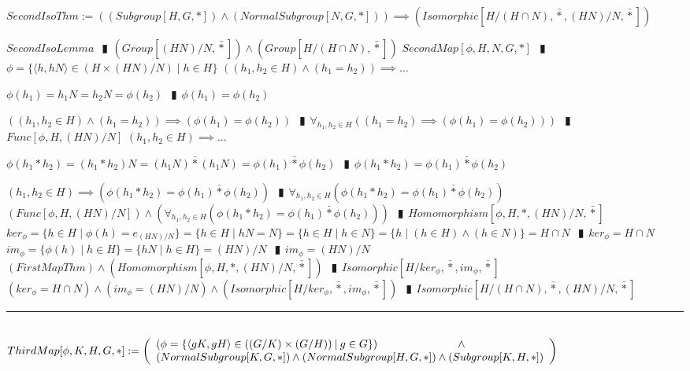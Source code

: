 \documentclass{book}
\newcommand{\abr}{:=}
\newcommand{\pipe}{$\phantom{(}\vrectangleblack\phantom{)}$}
\newcommand{\pr}[1]{\left(#1\right)}
\newcommand{\bbin}[1]{\mathbin{{\bar{#1}}}}
\newcommand{\st}{\mathbin{|}}
\begin{document}
$SecondIsoThm \abr \pr{(Subgroup[H, G, *]) \land (NormalSubgroup[N, G, *])} \implies \pr{Isomorphic[H / (H \cap N), \bbin{*}, (H N) / N, \bbin{*}]}$
\begin{enumerate}
  \lit $SecondIsoLemma$ \pipe $\pr{Group[(H N) / N, \bbin{*}]} \land \pr{Group[H / (H \cap N), \bbin{*}]}$
  \lit $SecondMap[\phi, H, N, G, *]$ \pipe $\phi = \{\langle h, h N \rangle \in \pr{H \times (H N) / N} \st h \in H\}$
  \lit $\pr{(h_1, h_2 \in H) \land (h_1 = h_2)} \implies \ldots$
  \begin{enumerate}
    \lit $\phi(h_1) = h_1 N = h_2 N = \phi(h_2)$ \pipe $\phi(h_1) = \phi(h_2)$
  \end{enumerate}
  \lit $\pr{(h_1, h_2 \in H) \land (h_1 = h_2)} \implies \pr{\phi(h_1) = \phi(h_2)}$ \pipe $\forall_{h_1, h_2 \in H}\pr{(h_1 = h_2) \implies \pr{\phi(h_1) = \phi(h_2)}}$ \pipe $Func[\phi, H, (H N) / N]$
  \lit $(h_1, h_2 \in H) \implies \ldots$
  \begin{enumerate}
    \lit $\phi(h_1 * h_2) = (h_1 * h_2) N = (h_1 N) \bbin{*} (h_1 N) = \phi(h_1) \bbin{*} \phi(h_2)$ \pipe $\phi(h_1 * h_2) = \phi(h_1) \bbin{*} \phi(h_2)$  %
  \end{enumerate}
  \lit $(h_1, h_2 \in H) \implies \pr{\phi(h_1 * h_2) = \phi(h_1) \bbin{*} \phi(h_2)}$ \pipe $\forall_{h_1, h_2 \in H}\pr{\phi(h_1 * h_2) = \phi(h_1) \bbin{*} \phi(h_2)}$
  \lit $\pr{Func[\phi, H, (H N) / N]} \land \pr{\forall_{h_1, h_2 \in H}\pr{\phi(h_1 * h_2) = \phi(h_1) \bbin{*} \phi(h_2)}}$ \pipe $Homomorphism[\phi, H, *, (H N) / N, \bbin{*}]$
  \lit $ker_\phi = \{h \in H \st \phi(h) = e_{(H N) / N}\} = \{h \in H \st h N = N\} = \{h \in H \st h \in N\} = \{h \st (h \in H) \land (h \in N)\} = H \cap N$ \pipe $ker_\phi = H \cap N$
  \lit $im_\phi = \{\phi(h) \st h \in H\} = \{h N \st h \in H\} = (H N) / N$ \pipe $im_\phi = (H N) / N$
  \lit $(FirstMapThm) \land \pr{Homomorphism[\phi, H, *, (H N) / N, \bbin{*}]}$ \pipe $Isomorphic[H / ker_\phi, \bbin{*}, im_\phi, \bbin{*}]$
  \lit $(ker_\phi = H \cap N) \land \pr{im_\phi = (H N) / N} \land (Isomorphic[H / ker_\phi, \bbin{*}, im_\phi, \bbin{*}])$ \pipe $Isomorphic[H / (H \cap N), \bbin{*}, (H N) / N, \bbin{*}]$
\end{enumerate} \vspace{.75mm} \hrule \vspace{.75mm} \ \\ 

$ThirdMap[\phi, K, H, G, *] \abr \left(\begin{array}{ll}
  \pr{\phi = \{\langle g K, g H \rangle \in \pr{(G / K) \times (G / H)} \st g \in G\}} \hfill \land \hfill \\
  (NormalSubgroup[K, G, *]) \hfill \land \hfill (NormalSubgroup[H, G, *]) \hfill \land \hfill (Subgroup[K, H, *])
\end{array}\right)$ \\
\end{document}
